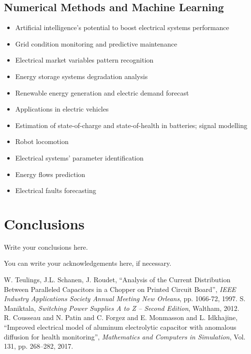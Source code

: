 \documentclass[smallextended,twocolumn]{electrimacs2024}
\begin{document}
\subsection{Numerical Methods and Machine Learning}
\begin{itemize}
\item Artificial intelligence’s potential to boost electrical systems performance
\item Grid condition monitoring and predictive maintenance
\item Electrical market variables pattern recognition
\item Energy storage systems degradation analysis
\item Renewable energy generation and electric demand forecast
\item Applications in electric vehicles
\item Estimation of state-of-charge and state-of-health in batteries; signal modelling
\item Robot locomotion
\item Electrical systems’ parameter identification
\item Energy flows prediction
\item Electrical faults forecasting
\end{itemize}


\section{Conclusions}
Write your conclusions here.

\begin{acknowledgements}
You can write your acknowledgements here, if necessary.
\end{acknowledgements}




\begin{thebibliography}{}
%
%
W. Teulings, J.L. Schanen, J. Roudet, %
``Analysis of the Current Distribution Between Paralleled Capacitors in a Chopper on Printed Circuit Board'',%
\emph{IEEE Industry Applications Society Annual Meeting New Orleans},%
pp. 1066-72, 1997.
%
S. Maniktala, %
\emph{Switching Power Supplies A to Z -- Second Edition},%
Waltham, 2012.
%
R. Cousseau and N. Patin and C. Forgez and E. Monmasson and L. Idkhajine,%
``Improved electrical model of aluminum electrolytic capacitor with anomalous diffusion for health monitoring'',%
\emph{Mathematics and Computers in Simulation},
Vol. 131, pp. 268--282, 2017.
\end{thebibliography}




%
\end{document}
